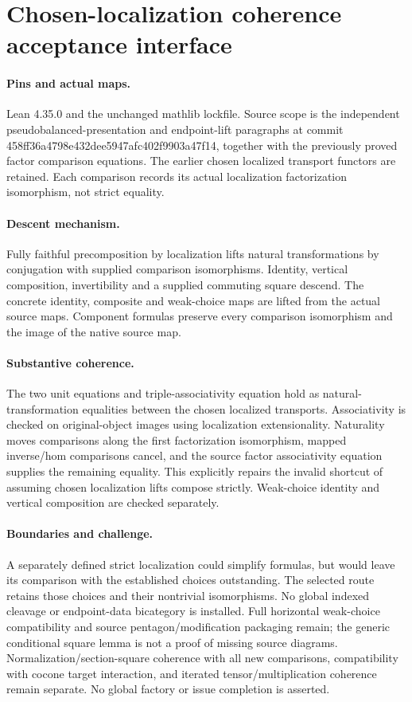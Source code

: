 \documentclass{article}
\begin{document}
\section*{Chosen-localization coherence acceptance interface}
\paragraph{Pins and actual maps.} Lean 4.35.0 and the unchanged mathlib lockfile. Source scope is the independent pseudobalanced-presentation and endpoint-lift paragraphs at commit 458ff36a4798e432dee5947afc402f9903a47f14, together with the previously proved factor comparison equations. The earlier chosen localized transport functors are retained. Each comparison records its actual localization factorization isomorphism, not strict equality.
\paragraph{Descent mechanism.} Fully faithful precomposition by localization lifts natural transformations by conjugation with supplied comparison isomorphisms. Identity, vertical composition, invertibility and a supplied commuting square descend. The concrete identity, composite and weak-choice maps are lifted from the actual source maps. Component formulas preserve every comparison isomorphism and the image of the native source map.
\paragraph{Substantive coherence.} The two unit equations and triple-associativity equation hold as natural-transformation equalities between the chosen localized transports. Associativity is checked on original-object images using localization extensionality. Naturality moves comparisons along the first factorization isomorphism, mapped inverse/hom comparisons cancel, and the source factor associativity equation supplies the remaining equality. This explicitly repairs the invalid shortcut of assuming chosen localization lifts compose strictly. Weak-choice identity and vertical composition are checked separately.
\paragraph{Boundaries and challenge.} A separately defined strict localization could simplify formulas, but would leave its comparison with the established choices outstanding. The selected route retains those choices and their nontrivial isomorphisms. No global indexed cleavage or endpoint-data bicategory is installed. Full horizontal weak-choice compatibility and source pentagon/modification packaging remain; the generic conditional square lemma is not a proof of missing source diagrams. Normalization/section-square coherence with all new comparisons, compatibility with cocone target interaction, and iterated tensor/multiplication coherence remain separate. No global factory or issue completion is asserted.
\end{document}
